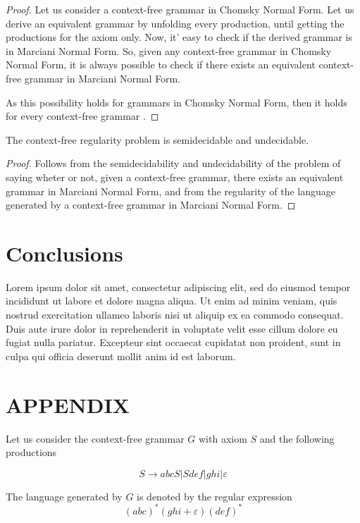 \documentclass[prodmode,acmtecs]{acmsmall}
\begin{document}
\begin{proof}
	Let us consider a context-free grammar in Chomsky Normal Form. Let
	us derive an equivalent grammar by unfolding every production, until
	getting the productions for the axiom only. Now, it' easy to check
	if the derived grammar is in Marciani Normal Form. So, given any context-free
	grammar in Chomsky Normal Form, it is always possible to check if
	there exists an equivalent context-free grammar in Marciani Normal
	Form.

	As this possibility holds for grammars in Chomsky Normal Form, then
	it holds for every context-free grammar \cite{Pettorossi13}.
\end{proof}

\begin{theorem}
	The context-free regularity problem is semidecidable and undecidable.
\end{theorem}

\begin{proof}
	Follows from the semidecidability and undecidability of the problem
	of saying wheter or not, given a context-free grammar, there exists
	an equivalent grammar in Marciani Normal Form, and from the regularity
	of the language generated by a context-free grammar in Marciani Normal
	Form.
\end{proof}

\section{Conclusions}
Lorem ipsum dolor sit amet, consectetur adipiscing elit, sed do eiusmod tempor incididunt ut labore et dolore magna aliqua.
Ut enim ad minim veniam, quis nostrud exercitation ullamco laboris nisi ut aliquip ex ea commodo consequat.
Duis aute irure dolor in reprehenderit in voluptate velit esse cillum dolore eu fugiat nulla pariatur.
Excepteur sint occaecat cupidatat non proident, sunt in culpa qui officia deserunt mollit anim id est laborum.

\appendix
\section*{APPENDIX}
\setcounter{section}{1}

\begin{example}
	Let us consider the context-free grammar $G$ with axiom $S$ and
	the following productions

	\[
	S\rightarrow abcS|Sdef|ghi|\varepsilon
	\]


	The language generated by $G$ is denoted by the regular expression
	\[
	(abc)^{*}(ghi+\varepsilon)(def)^{*}
	\]

\end{example}
\end{document}
